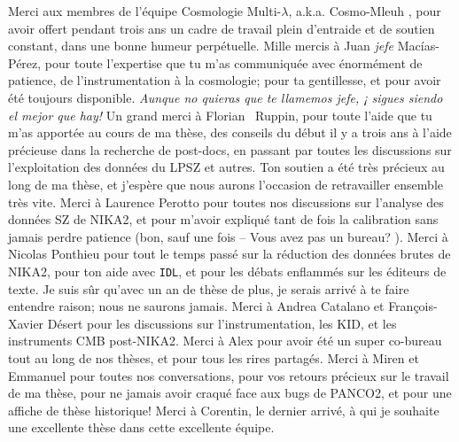 Merci aux membres de l'équipe Cosmologie Multi-$\lambda$, a.k.a. \guillemotleft Cosmo-Mleuh \guillemotright, pour avoir offert pendant trois ans un cadre de travail plein d'entraide et de soutien constant, dans une bonne humeur perpétuelle.
Mille mercis à Juan \textit{jefe} Mac\'ias-P\'erez, pour toute l'expertise que tu m'as communiquée avec énormément de patience, de l'instrumentation à la cosmologie; pour ta gentillesse, et pour avoir été toujours disponible.
\textit{Aunque no quieras que te llamemos jefe, ¡ sigues siendo el mejor que hay!}
Un grand merci à Florian  \guillemotright\ Ruppin, pour toute l'aide que tu m'as apportée au cours de ma thèse, des conseils du début il y a trois ans à l'aide précieuse dans la recherche de post-docs, en passant par toutes les discussions sur l'exploitation des données du LPSZ et autres.
Ton soutien a été très précieux au long de ma thèse, et j'espère que nous aurons l'occasion de retravailler ensemble très vite.
Merci à Laurence Perotto pour toutes nos discussions sur l'analyse des données SZ de NIKA2, et pour m'avoir expliqué tant de fois la calibration sans jamais perdre patience (bon, sauf une fois -- \guillemotleft Vous avez pas un bureau? \guillemotright).
Merci à Nicolas Ponthieu pour tout le temps passé sur la réduction des données brutes de NIKA2, pour ton aide avec \texttt{IDL}, et pour les débats enflammés sur les éditeurs de texte.
Je suis sûr qu'avec un an de thèse de plus, je serais arrivé à te faire entendre raison; nous ne saurons jamais.
Merci à Andrea Catalano et François-Xavier Désert pour les discussions sur l'instrumentation, les KID, et les instruments CMB post-NIKA2.
Merci à Alex pour avoir été un super co-bureau tout au long de nos thèses, et pour tous les rires partagés.
Merci à Miren et Emmanuel pour toutes nos conversations, pour vos retours précieux sur le travail de ma thèse, pour ne jamais avoir craqué face aux bugs de PANCO2, et pour une affiche de thèse historique!
Merci à Corentin, le dernier arrivé, à qui je souhaite une excellente thèse dans cette excellente équipe.

